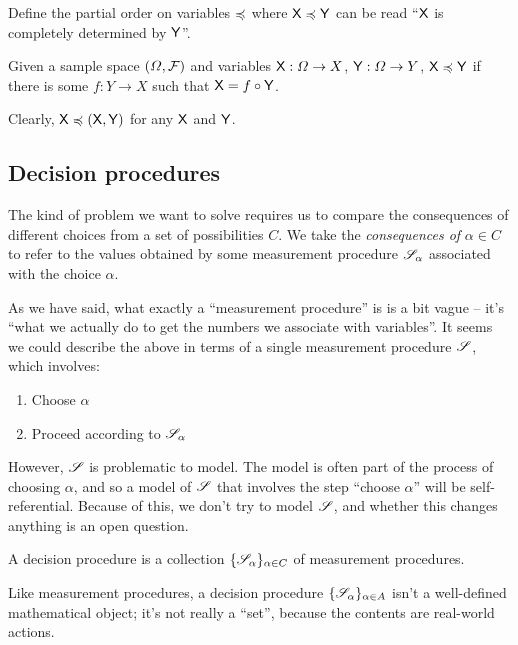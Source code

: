 Define the partial order on variables $\preccurlyeq$ where $\mathsf{X}\preccurlyeq \mathsf{Y}$ can be read ``$\mathsf{X}$ is completely determined by $\mathsf{Y}$''.

\begin{definition}\label{def:variable_po}
Given a sample space $(\Omega,\mathcal{F})$ and variables $\mathsf{X}:\Omega\to X$, $\mathsf{Y}:\Omega\to Y$, $\mathsf{X}\preccurlyeq \mathsf{Y}$ if there is some $f:Y\to X$ such that $\mathsf{X}=f\circ \mathsf{Y}$.
\end{definition}

Clearly, $\mathsf{X}\preccurlyeq(\mathsf{X},\mathsf{Y})$ for any $\mathsf{X}$ and $\mathsf{Y}$.

\subsection{Decision procedures}\label{sec:actions}

The kind of problem we want to solve requires us to compare the consequences of different choices from a set of possibilities $C$. We take the \emph{consequences of} $\alpha\in C$ to refer to the values obtained by some measurement procedure $\mathscr{S}_\alpha$ associated with the choice $\alpha$.

As we have said, what exactly a ``measurement procedure'' is is a bit vague -- it's ``what we actually do to get the numbers we associate with variables''. It seems we could describe the above in terms of a single measurement procedure $\mathscr{S}$, which involves:

\begin{enumerate}
    \item Choose $\alpha$
    \item Proceed according to $\mathscr{S}_\alpha$
\end{enumerate}

However, $\mathscr{S}$ is problematic to model. The model is often part of the process of choosing $\alpha$, and so a model of $\mathscr{S}$ that involves the step ``choose $\alpha$'' will be self-referential. Because of this, we don't try to model $\mathscr{S}$, and whether this changes anything is an open question.

\begin{definition}
A decision procedure is a collection $\{\mathscr{S}_\alpha\}_{\alpha\in C}$ of measurement procedures.
\end{definition}

Like measurement procedures, a decision procedure $\{\mathscr{S}_\alpha\}_{\alpha\in A}$ isn't a well-defined mathematical object; it's not really a ``set'', because the contents are real-world actions.

